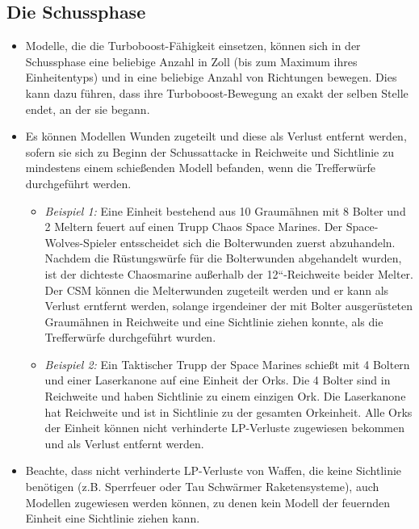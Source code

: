 \subsection{Die Schussphase}

\begin{itemize}

 \item Modelle, die die Turboboost-Fähigkeit einsetzen, können sich in der
  Schussphase eine beliebige Anzahl in Zoll (bis zum Maximum ihres
  Einheitentyps) und in eine beliebige Anzahl von Richtungen bewegen. Dies kann
  dazu führen, dass ihre Turboboost-Bewegung an exakt der selben Stelle endet,
  an der sie begann.

 \item Es können Modellen Wunden zugeteilt und diese als Verlust entfernt
  werden, sofern sie sich zu Beginn der Schussattacke in Reichweite und
  Sichtlinie zu mindestens einem schießenden Modell befanden, wenn die
  Trefferwürfe durchgeführt werden.
\begin{itemize}

 \item \textit{Beispiel 1:} Eine Einheit bestehend aus 10 Graumähnen mit 8 Bolter und 2
  Meltern feuert auf einen Trupp Chaos Space Marines. Der Space-Wolves-Spieler
  entsscheidet sich die Bolterwunden zuerst abzuhandeln. Nachdem die
  Rüstungswürfe für die Bolterwunden abgehandelt wurden, ist der dichteste
  Chaosmarine außerhalb der 12“-Reichweite beider Melter. Der CSM können die
  Melterwunden zugeteilt werden und er kann als Verlust erntfernt werden,
  solange irgendeiner der mit Bolter ausgerüsteten Graumähnen in Reichweite und
  eine Sichtlinie ziehen konnte, als die Trefferwürfe durchgeführt wurden.

 \item \textit{Beispiel 2:} Ein Taktischer Trupp der Space Marines schießt mit 4 Boltern
  und einer Laserkanone auf eine Einheit der Orks. Die 4 Bolter sind in
  Reichweite und haben Sichtlinie zu einem einzigen Ork. Die Laserkanone hat
  Reichweite und ist in Sichtlinie zu der gesamten Orkeinheit. Alle Orks der
  Einheit können nicht verhinderte LP-Verluste zugewiesen bekommen und als
  Verlust entfernt werden.

\end{itemize}

\item Beachte, dass nicht verhinderte LP-Verluste von Waffen, die keine
 Sichtlinie benötigen (z.B. Sperrfeuer oder Tau Schwärmer Raketensysteme), auch
 Modellen zugewiesen werden können, zu denen kein Modell der feuernden Einheit
 eine Sichtlinie ziehen kann.


\end{itemize}
